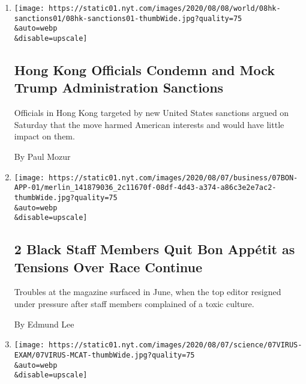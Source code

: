 \begin{enumerate}
\def\labelenumi{\arabic{enumi}.}
\item
  \href{/2020/08/08/world/asia/hong-kong-sanctions-united-states.html}{}

  \texttt{[image: https://static01.nyt.com/images/2020/08/08/world/08hk-sanctions01/08hk-sanctions01-thumbWide.jpg?quality=75\\\&auto=webp\\\&disable=upscale]}

  \hypertarget{hong-kong-officials-condemn-and-mock-trump-administration-sanctions}{%
  \subsection{Hong Kong Officials Condemn and Mock Trump Administration
  Sanctions}\label{hong-kong-officials-condemn-and-mock-trump-administration-sanctions}}

  Officials in Hong Kong targeted by new United States sanctions argued
  on Saturday that the move harmed American interests and would have
  little impact on them.

  By Paul Mozur
\item
  \href{/2020/08/07/business/media/bon-appetit-race-black-staff-quits.html}{}

  \texttt{[image: https://static01.nyt.com/images/2020/08/07/business/07BON-APP-01/merlin\_141879036\_2c11670f-08df-4d43-a374-a86c3e2e7ac2-thumbWide.jpg?quality=75\\\&auto=webp\\\&disable=upscale]}

  \hypertarget{2-black-staff-members-quit-bon-appuxe9tit-as-tensions-over-race-continue}{%
  \subsection{2 Black Staff Members Quit Bon Appétit as Tensions Over
  Race
  Continue}\label{2-black-staff-members-quit-bon-appuxe9tit-as-tensions-over-race-continue}}

  Troubles at the magazine surfaced in June, when the top editor
  resigned under pressure after staff members complained of a toxic
  culture.

  By Edmund Lee
\item
  \href{/2020/08/07/health/coronavirus-exams-mcat.html}{}

  \texttt{[image: https://static01.nyt.com/images/2020/08/07/science/07VIRUS-EXAM/07VIRUS-MCAT-thumbWide.jpg?quality=75\\\&auto=webp\\\&disable=upscale]}

  \hypertarget{want-to-be-a-doctor-take-your-chances-in-a-closed-room-with-strangers}{%
}
\end{enumerate}

